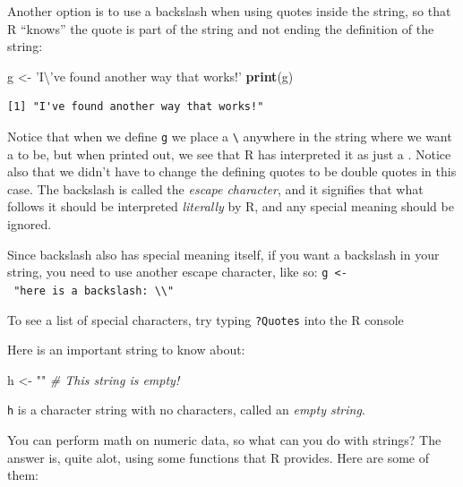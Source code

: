 \documentclass[
]{article}
\newenvironment{Shaded}{\begin{snugshade}}{\end{snugshade}}
\newcommand{\CharTok}[1]{\textcolor[rgb]{0.31,0.60,0.02}{#1}}
\newcommand{\CommentTok}[1]{\textcolor[rgb]{0.56,0.35,0.01}{\textit{#1}}}
\newcommand{\KeywordTok}[1]{\textcolor[rgb]{0.13,0.29,0.53}{\textbf{#1}}}
\newcommand{\NormalTok}[1]{#1}
\newcommand{\StringTok}[1]{\textcolor[rgb]{0.31,0.60,0.02}{#1}}
\newenvironment{bonus}{
  \specialblock{bonus}{sun-fill.png}{Bonus}
}{\endspecialblock}
\begin{document}
Another option is to use a backslash when using quotes inside the string, so that R ``knows'' the quote is part of the string and not ending the definition of the string:

\begin{Shaded}
\begin{Highlighting}[]
\NormalTok{g <-}\StringTok{ 'I}\CharTok{\textbackslash{}'}\StringTok{ve found another way that works!'}
\KeywordTok{print}\NormalTok{(g)}
\end{Highlighting}
\end{Shaded}

\begin{verbatim}
[1] "I've found another way that works!"
\end{verbatim}

Notice that when we define \texttt{g} we place a \texttt{\textbackslash{}\textquotesingle{}} anywhere in the string where we want a \texttt{\textquotesingle{}} to be, but when printed out, we see that R has interpreted it as just a \texttt{\textquotesingle{}}.
Notice also that we didn't have to change the defining quotes to be double quotes in this case.
The backslash is called the \emph{escape character}, and it signifies that what follows it should be interpreted \emph{literally} by R, and any special meaning should be ignored.

\begin{bonus}
Since backslash also has special meaning itself, if you want a backslash
in your string, you need to use another escape character, like so:
\texttt{g\ \textless{}-\ "here\ is\ a\ backslash:\ \textbackslash{}\textbackslash{}"}

To see a list of special characters, try typing \texttt{?Quotes} into
the R console
\end{bonus}

Here is an important string to know about:

\begin{Shaded}
\begin{Highlighting}[]
\NormalTok{h <-}\StringTok{ ""}              \CommentTok{# This string is empty!}
\end{Highlighting}
\end{Shaded}

\texttt{h} is a character string with no characters, called an \emph{empty string}.

You can perform math on numeric data, so what can you do with strings?
The answer is, quite alot, using some functions that R provides.
Here are some of them:
\end{document}

